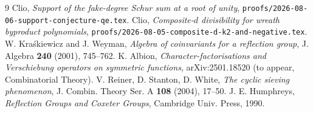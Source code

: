 \documentclass[11pt]{article}
\theoremstyle{remark}
\begin{document}
\begin{thebibliography}{9}
 Clio, \emph{Support of the fake-degree Schur sum at a root of unity}, \texttt{proofs/2026-08-06-support-conjecture-qe.tex}.
 Clio, \emph{Composite-$d$ divisibility for wreath byproduct polynomials}, \texttt{proofs/2026-08-05-composite-d-k2-and-negative.tex}.
 W. Kra\'skiewicz and J. Weyman, \emph{Algebra of coinvariants for a reflection group}, J. Algebra \textbf{240} (2001), 745--762.
 K. Albion, \emph{Character-factorisations and Verschiebung operators on symmetric functions}, arXiv:2501.18520 (to appear, Combinatorial Theory).
 V. Reiner, D. Stanton, D. White, \emph{The cyclic sieving phenomenon}, J. Combin. Theory Ser. A \textbf{108} (2004), 17--50.
 J. E. Humphreys, \emph{Reflection Groups and Coxeter Groups}, Cambridge Univ. Press, 1990.
\end{thebibliography}
\end{document}
